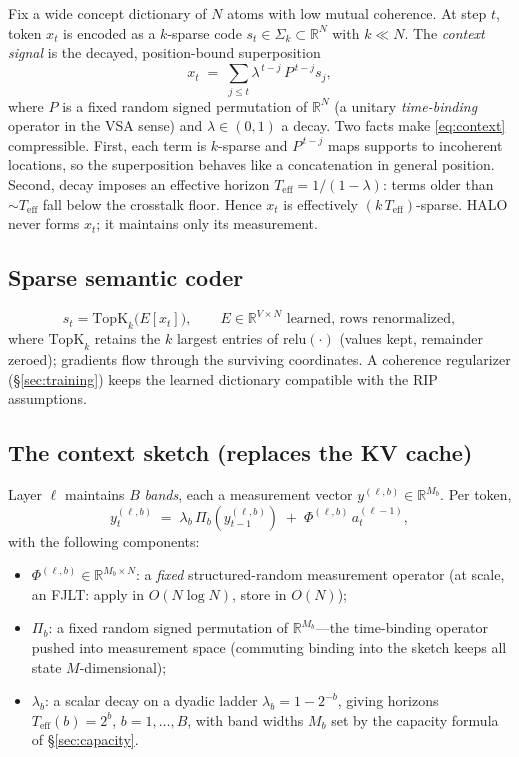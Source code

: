 \documentclass[11pt]{article}
\newcommand{\R}{\mathbb{R}}
\newcommand{\topk}{\mathrm{TopK}}
\begin{document}
Fix a wide concept dictionary of $N$ atoms with low mutual coherence. At step $t$, token $x_t$ is encoded as a $k$-sparse code $s_t \in \Sigma_k \subset \R^N$ with $k \ll N$. The \emph{context signal} is the decayed, position-bound superposition
\begin{equation}
\label{eq:context}
x_t \;=\; \sum_{j \le t} \lambda^{\,t-j}\, P^{\,t-j} s_j ,
\end{equation}
where $P$ is a fixed random signed permutation of $\R^N$ (a unitary \emph{time-binding} operator in the VSA sense) and $\lambda \in (0,1)$ a decay. Two facts make \eqref{eq:context} compressible. First, each term is $k$-sparse and $P^{\,t-j}$ maps supports to incoherent locations, so the superposition behaves like a concatenation in general position. Second, decay imposes an effective horizon $T_{\mathrm{eff}} = 1/(1-\lambda)$: terms older than $\sim T_{\mathrm{eff}}$ fall below the crosstalk floor. Hence $x_t$ is effectively $(k\,T_{\mathrm{eff}})$-sparse. HALO never forms $x_t$; it maintains only its measurement.

\subsection{Sparse semantic coder}

\begin{equation}
s_t = \topk_k\big(E[x_t]\big), \qquad E \in \R^{V \times N} \text{ learned, rows renormalized},
\end{equation}
where $\topk_k$ retains the $k$ largest entries of $\mathrm{relu}(\cdot)$ (values kept, remainder zeroed); gradients flow through the surviving coordinates. A coherence regularizer (\S\ref{sec:training}) keeps the learned dictionary compatible with the RIP assumptions.

\subsection{The context sketch (replaces the KV cache)}
\label{sec:sketch}

Layer $\ell$ maintains $B$ \emph{bands}, each a measurement vector $y^{(\ell,b)} \in \R^{M_b}$. Per token,
\begin{equation}
\label{eq:sketch}
y_t^{(\ell,b)} \;=\; \lambda_b \,\Pi_b\!\left(y_{t-1}^{(\ell,b)}\right) \;+\; \Phi^{(\ell,b)}\, a_t^{(\ell-1)} ,
\end{equation}
with the following components:
\begin{itemize}
  \item $\Phi^{(\ell,b)} \in \R^{M_b \times N}$: a \emph{fixed} structured-random measurement operator (at scale, an FJLT: apply in $O(N\log N)$, store in $O(N)$);
  \item $\Pi_b$: a fixed random signed permutation of $\R^{M_b}$---the time-binding operator pushed into measurement space (commuting binding into the sketch keeps all state $M$-dimensional);
  \item $\lambda_b$: a scalar decay on a dyadic ladder $\lambda_b = 1 - 2^{-b}$, giving horizons $T_{\mathrm{eff}}(b) = 2^b$, $b = 1,\dots,B$, with band widths $M_b$ set by the capacity formula of \S\ref{sec:capacity}.
\end{itemize}
\end{document}
